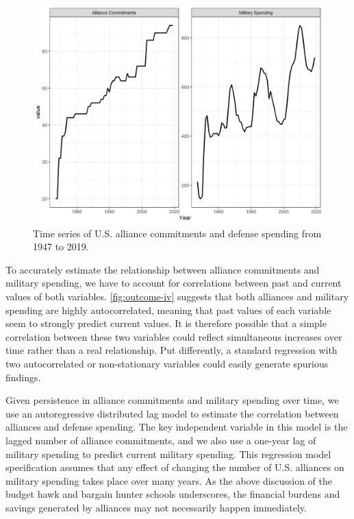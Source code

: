 \documentclass[12pt,hidelinks]{article}
\begin{document}
\begin{figure}
\includegraphics[width = .95\textwidth]{../figures/outcome-iv.png}
\caption{Time series of U.S. alliance commitments and defense spending from 1947 to 2019.}
\label{fig:outcome-iv}
\end{figure}


To accurately estimate the relationship between alliance commitments and military spending, we have to account for correlations between past and current values of both variables.
\autoref{fig:outcome-iv} suggests that both alliances and military spending are highly autocorrelated, meaning that past values of each variable seem to strongly predict current values. 
It is therefore possible that a simple correlation between these two variables could reflect simultaneous increases over time rather than a real relationship. 
Put differently, a standard regression with two autocorrelated or non-stationary variables could easily generate spurious findings.\autocite{GrangerNewbold1974}


Given persistence in alliance commitments and military spending over time, we use an autoregressive distributed lag model to estimate the correlation between alliances and defense spending.
The key independent variable in this model is the lagged number of alliance commitments, and we also use a one-year lag of military spending to predict current military spending. 
This regression model specification assumes that any effect of changing the number of U.S. alliances on military spending takes place over many years.
As the above discussion of the budget hawk and bargain hunter schools underscores, the financial burdens and savings generated by alliances may not necessarily happen immediately.
\end{document}
